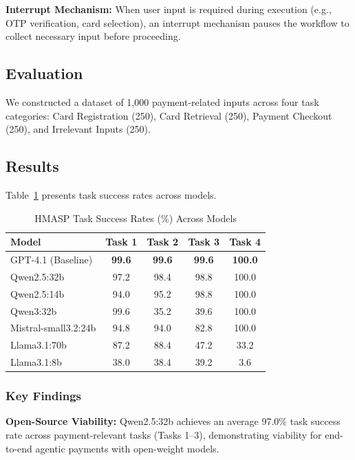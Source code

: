 \textbf{Interrupt Mechanism:} When user input is required during execution (e.g., OTP verification, card selection), an interrupt mechanism pauses the workflow to collect necessary input before proceeding.

\subsection{Evaluation}

We constructed a dataset of 1,000 payment-related inputs across four task categories: Card Registration (250), Card Retrieval (250), Payment Checkout (250), and Irrelevant Inputs (250).

\subsection{Results}

Table~\ref{tab:hmasp_results} presents task success rates across models.

\begin{table}[htbp]
\centering
\caption{HMASP Task Success Rates (\%) Across Models}
\label{tab:hmasp_results}
\begin{tabular}{@{}lcccc@{}}
\toprule
\textbf{Model} & \textbf{Task 1} & \textbf{Task 2} & \textbf{Task 3} & \textbf{Task 4} \\
\midrule
GPT-4.1 (Baseline) & \textbf{99.6} & \textbf{99.6} & \textbf{99.6} & \textbf{100.0} \\
Qwen2.5:32b & 97.2 & 98.4 & 98.8 & 100.0 \\
Qwen2.5:14b & 94.0 & 95.2 & 98.8 & 100.0 \\
Qwen3:32b & 99.6 & 35.2 & 39.6 & 100.0 \\
Mistral-small3.2:24b & 94.8 & 94.0 & 82.8 & 100.0 \\
Llama3.1:70b & 87.2 & 88.4 & 47.2 & 33.2 \\
Llama3.1:8b & 38.0 & 38.4 & 39.2 & 3.6 \\
\bottomrule
\end{tabular}
\end{table}

\subsubsection{Key Findings}

\textbf{Open-Source Viability:} Qwen2.5:32b achieves an average 97.0\% task success rate across payment-relevant tasks (Tasks 1--3), demonstrating viability for end-to-end agentic payments with open-weight models.

